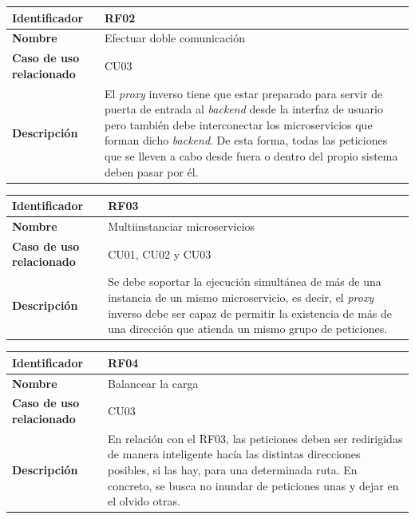 \documentclass[11pt,spanish,listoffigures]{tfgetsinf}
\begin{document}
\begin{center} \begin{tabular}{| l | p{9.5cm} |}
\hline
\textbf{Identificador} & RF02
\\ \hline
\textbf{Nombre} & Efectuar doble comunicación
\\ \hline
\textbf{Caso de uso relacionado} & CU03
\\ \hline
\textbf{Descripción} & El \emph{proxy} inverso tiene que estar preparado para servir de puerta de entrada al \emph{backend} desde la interfaz de usuario pero también debe interconectar los microservicios que forman dicho \emph{backend}. De esta forma, todas las peticiones que se lleven a cabo desde fuera o dentro del propio sistema deben pasar por él.
\\ \hline \end{tabular} \end{center}

\begin{center} \begin{tabular}{| l | p{9.5cm} |}
\hline
\textbf{Identificador} & RF03
\\ \hline
\textbf{Nombre} & Multiinstanciar microservicios
\\ \hline
\textbf{Caso de uso relacionado} & CU01, CU02 y CU03
\\ \hline
\textbf{Descripción} & Se debe soportar la ejecución simultánea de más de una instancia de un mismo microservicio, es decir, el \emph{proxy} inverso debe ser capaz de permitir la existencia de más de una dirección que atienda un mismo grupo de peticiones.
\\ \hline \end{tabular} \end{center}

\begin{center} \begin{tabular}{| l | p{9.5cm} |}
\hline
\textbf{Identificador} & RF04
\\ \hline
\textbf{Nombre} & Balancear la carga
\\ \hline
\textbf{Caso de uso relacionado} & CU03
\\ \hline
\textbf{Descripción} & En relación con el RF03, las peticiones deben ser redirigidas de manera inteligente hacía las distintas direcciones posibles, si las hay, para una determinada ruta. En concreto, se busca no inundar de peticiones unas y dejar en el olvido otras.
\\ \hline \end{tabular} \end{center}
\end{document}
